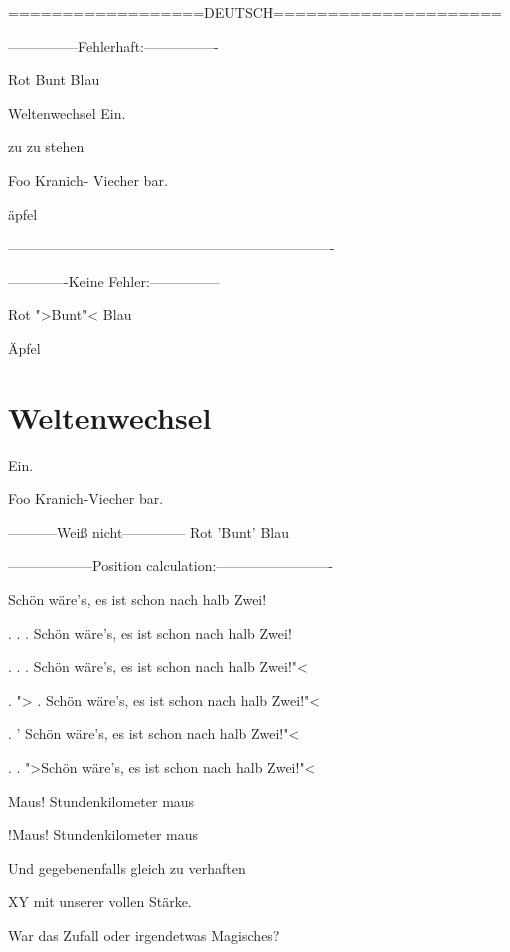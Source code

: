
==================DEUTSCH=====================

---------------Fehlerhaft:----------------



Rot Bunt Blau


Weltenwechsel Ein.


zu zu stehen


Foo Kranich- Viecher bar. 


\"{a}pfel

----------------------------------------------------------------------

-------------Keine Fehler:---------------



Rot ">Bunt"< Blau


\"{A}pfel


\chapter{Weltenwechsel}
Ein.





Foo Kranich-Viecher bar. 



-----------Weiß nicht--------------
Rot 'Bunt' Blau




------------------Position calculation:-------------------------

Schön wäre's, es ist schon nach halb Zwei!

. . . Schön wäre's, es ist schon nach halb Zwei! 

. . . Schön wäre's, es ist schon nach halb Zwei!"< 

. "> . Schön wäre's, es ist schon nach halb Zwei!"< 

. ' Schön wäre's, es ist schon nach halb Zwei!"< 

. . ">Schön wäre's, es ist schon nach halb Zwei!"< 


Maus! Stundenkilometer maus


!Maus! Stundenkilometer maus

Und gegebenenfalls gleich zu verhaften

XY mit unserer vollen Stärke.

War das Zufall oder irgendetwas Magisches?